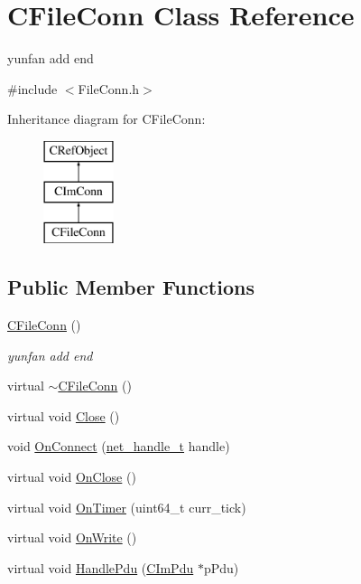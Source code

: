 \hypertarget{class_c_file_conn}{}\section{C\+File\+Conn Class Reference}
\label{class_c_file_conn}


yunfan add end  




{\ttfamily \#include $<$File\+Conn.\+h$>$}

Inheritance diagram for C\+File\+Conn\+:\begin{figure}[H]
\begin{center}
\leavevmode
\includegraphics[height=3.000000cm]{class_c_file_conn}
\end{center}
\end{figure}
\subsection*{Public Member Functions}
\begin{DoxyCompactItemize}
\item 
\hyperlink{class_c_file_conn_af588aac3e2633cab63e8752ca511f67c}{C\+File\+Conn} ()
\begin{DoxyCompactList}\small\item\em yunfan add end \end{DoxyCompactList}\item 
virtual \hyperlink{class_c_file_conn_af090196d15ef6187962f71a709d93901}{$\sim$\+C\+File\+Conn} ()
\item 
virtual void \hyperlink{class_c_file_conn_a41033d47c83a957921b2c8657f4f3300}{Close} ()
\item 
void \hyperlink{class_c_file_conn_a00b41e34197cd0f2fbf69d6b240c5792}{On\+Connect} (\hyperlink{base_2ostype_8h_a5e1697fa312aa00ac7305460abf166fd}{net\+\_\+handle\+\_\+t} handle)
\item 
virtual void \hyperlink{class_c_file_conn_a702c2b62a53e4ca8e61947f4383c1559}{On\+Close} ()
\item 
virtual void \hyperlink{class_c_file_conn_adf6c36077defe60139abb750034a8b05}{On\+Timer} (uint64\+\_\+t curr\+\_\+tick)
\item 
virtual void \hyperlink{class_c_file_conn_a6bbdb156d47876abdce052b5cdd8f279}{On\+Write} ()
\item 
virtual void \hyperlink{class_c_file_conn_ae5ead1c0ca9d433630779cdd7f76f8ce}{Handle\+Pdu} (\hyperlink{class_c_im_pdu}{C\+Im\+Pdu} $\ast$p\+Pdu)
\end{DoxyCompactItemize}
